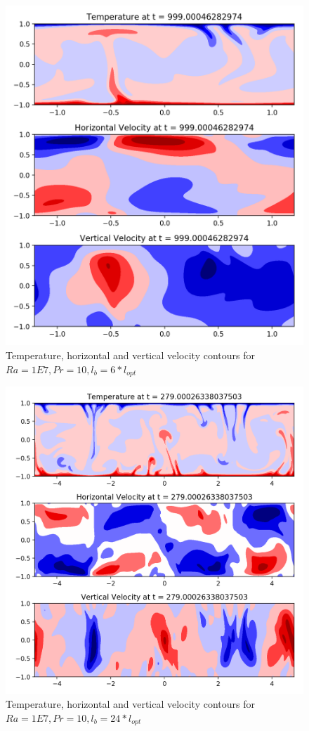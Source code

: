 \documentclass[12pt]{article}
\begin{document}
     \begin{figure}[!htb]
     	\includegraphics[width=\linewidth]{contours_1E7_10_6.png}
     	\caption{Temperature, horizontal and vertical velocity contours for $Ra = 1E7, Pr =10, l_b = 6* l_{opt} $ }
     	\label{fig:fig20}
     \end{figure}
     
     \begin{figure}[!htb]
     	\includegraphics[width=\linewidth]{contours_1E7_10_24.png}
     	\caption{Temperature, horizontal and vertical velocity contours for $Ra = 1E7, Pr =10, l_b = 24* l_{opt} $ }
     	\label{fig:fig21}
     \end{figure}
     
\end{document}
